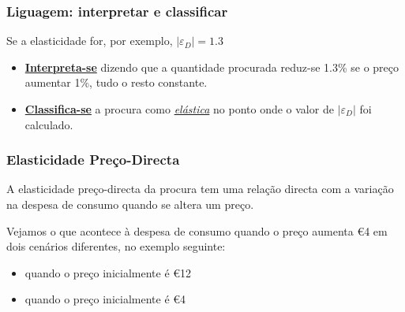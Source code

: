 \begin{frame}
	\frametitle{Liguagem: interpretar e classificar}
	Se a elasticidade for, por exemplo, $|\varepsilon_D|=1.3$

	\begin{itemize}
		\setlength{\itemsep}{0.2cm}
		\item \textbf{\underline{Interpreta-se}} dizendo que a quantidade procurada reduz-se 1.3\% se o pre\c co aumentar 1\%, tudo o resto constante.
		\item \textbf{\underline{Classifica-se}} a procura como \underline{\emph{el\'astica}} no ponto onde o valor de $|\varepsilon_D|$ foi calculado.
	\end{itemize}
\end{frame}

\begin{frame}
	\frametitle{Elasticidade Pre\c co-Directa}
	A elasticidade pre\c co-directa da procura tem uma rela\c c\~ao directa com a varia\c c\~ao na despesa de consumo quando se altera um pre\c co.\par
	
	Vejamos o que acontece \`a despesa de consumo quando o pre\c co aumenta \euro 4 em dois cen\'arios diferentes, no exemplo seguinte:
	\begin{itemize}
		\item quando o pre\c co inicialmente \'e \euro 12
		\item quando o pre\c co inicialmente \'e \euro 4
	\end{itemize}
\end{frame}

